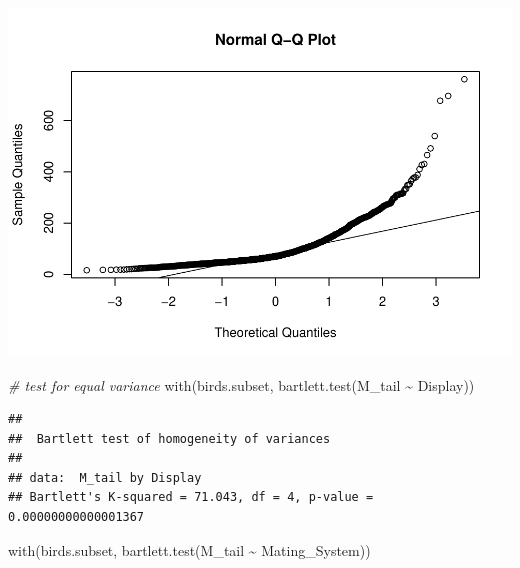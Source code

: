 \documentclass[
  12pt,
]{article}
\newenvironment{Shaded}{\begin{snugshade}}{\end{snugshade}}
\newcommand{\CommentTok}[1]{\textcolor[rgb]{0.56,0.35,0.01}{\textit{#1}}}
\newcommand{\FunctionTok}[1]{\textcolor[rgb]{0.00,0.00,0.00}{#1}}
\newcommand{\NormalTok}[1]{#1}
\newcommand{\SpecialCharTok}[1]{\textcolor[rgb]{0.00,0.00,0.00}{#1}}
\begin{document}
\begin{Shaded}
\end{Shaded}

\includegraphics{Project_Code_files/figure-latex/question_2-1.pdf}

\begin{Shaded}
\begin{Highlighting}[]
\CommentTok{\# test for equal variance}
\FunctionTok{with}\NormalTok{(birds.subset, }\FunctionTok{bartlett.test}\NormalTok{(M\_tail }\SpecialCharTok{\textasciitilde{}}\NormalTok{ Display))}
\end{Highlighting}
\end{Shaded}

\begin{verbatim}
## 
##  Bartlett test of homogeneity of variances
## 
## data:  M_tail by Display
## Bartlett's K-squared = 71.043, df = 4, p-value = 0.00000000000001367
\end{verbatim}

\begin{Shaded}
\begin{Highlighting}[]
\FunctionTok{with}\NormalTok{(birds.subset, }\FunctionTok{bartlett.test}\NormalTok{(M\_tail }\SpecialCharTok{\textasciitilde{}}\NormalTok{ Mating\_System))}
\end{Highlighting}
\end{Shaded}
\end{document}
